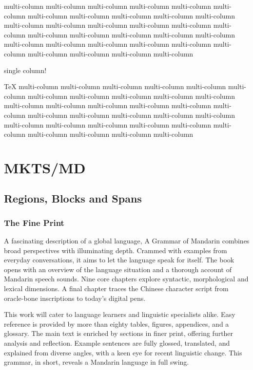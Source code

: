
\begin{multicols}{2}





\mktsShowpar\par
multi-column multi-column multi-column multi-column multi-column multi-column multi-column multi-column
multi-column multi-column multi-column multi-column multi-column multi-column multi-column multi-column
multi-column multi-column multi-column multi-column multi-column multi-column multi-column multi-column
multi-column multi-column multi-column multi-column multi-column multi-column multi-column multi-column\mktsShowpar\par
\end{multicols}
single column!
\begin{multicols}{2}\mktsShowpar\par
\TeX{}
multi-column multi-column multi-column multi-column multi-column multi-column multi-column multi-column
multi-column multi-column multi-column multi-column multi-column multi-column multi-column multi-column
multi-column multi-column multi-column multi-column multi-column multi-column multi-column multi-column
multi-column multi-column multi-column multi-column multi-column multi-column multi-column multi-column\mktsShowpar\par
\end{multicols}
\chapter{MKTS/MD
}
\begin{multicols}{2}\end{multicols}
\section{Regions, Blocks and Spans
}
\begin{multicols}{2}
\subsection{The Fine Print
}
A fascinating description of a global language, {\mktsStyleItalic{}A Grammar of Mandarin\/} combines broad perspectives with illuminating depth. Crammed with examples from everyday conversations, it aims to let the language speak for itself. The book opens with an overview of the language situation and a thorough account of Mandarin speech sounds. Nine core chapters explore syntactic, morphological and lexical dimensions. A final chapter traces the Chinese character script from oracle-bone inscriptions to today’s digital pens.\mktsShowpar\par
This work will cater to language learners and linguistic specialists alike. Easy reference is provided by more than eighty tables, figures, appendices, and a glossary. The main text is enriched by sections in finer print, offering further analysis and reflection. Example sentences are fully glossed, translated, and explained from diverse angles, with a keen eye for recent linguistic change. This grammar, in short, reveals a Mandarin language in full swing.\mktsShowpar\par
\end{multicols}

